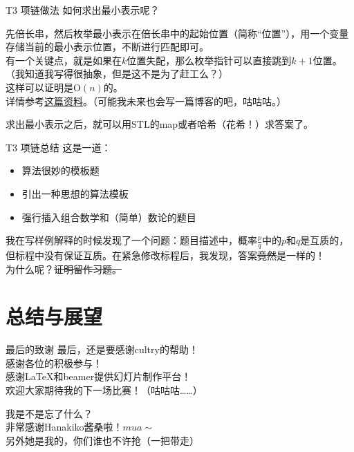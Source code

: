 \documentclass[utf8]{beamer}
\begin{document}
\begin{frame}{T3 项链}{做法}
    如何求出最小表示呢？\newline
    \pause

    先倍长串，然后枚举最小表示在倍长串中的起始位置（简称“位置”），用一个变量存储当前的最小表示位置，不断进行匹配即可。\\
    有一个关键点，就是如果在$k$位置失配，那么枚举指针可以直接跳到$k+1$位置。（我知道我写得很抽象，但是这不是为了赶工么？）\\
    这样可以证明是$\text{O}(n)$的。\\
    详情参考\href{https://blog.csdn.net/tianyuhang123/article/details/54919715}{这篇资料}。（可能我未来也会写一篇博客的吧，咕咕咕。）\newline

    \pause
    求出最小表示之后，就可以用STL的map或者哈希（花希！）求答案了。
\end{frame}
\begin{frame}{T3 项链}{总结}
    这是一道：
    \begin{itemize}
        \item 算法很妙的模板题
        \item 引出一种思想的算法模板
        \item 强行插入组合数学和（简单）数论的题目
    \end{itemize}
    \pause

    我在写样例解释的时候发现了一个问题：题目描述中，概率$\frac{p}{q}$中的$p$和$q$是互质的，但标程中没有保证互质。在紧急修改标程后，我发现，答案\sout{竟然}是一样的！\\
    为什么呢？\sout{证明留作习题。}
\end{frame}
\section{总结与展望}
\begin{frame}{最后的致谢}
    最后，还是要感谢\textcolor{admin}{cultry}的帮助！\\
    感谢各位的积极参与！\\
    感谢\LaTeX 和beamer提供幻灯片制作平台！\\
    欢迎大家期待我的下一场比赛！（咕咕咕……）\newline

    \pause
    我是不是忘了什么？\\
    非常感谢Hanakiko\sout{酱}桑啦！$mua\sim$\\
    \pause
    另外她是我的，你们谁也不许抢（一把带走）
\end{frame}
\end{document}
